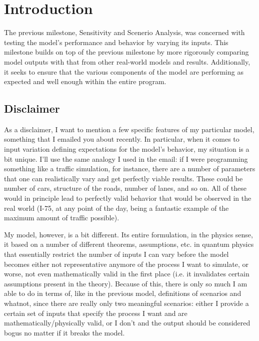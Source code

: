 \section{Introduction}

The previous milestone, Sensitivity and Scenerio Analysis, was concerned with testing the model's performance and behavior by varying its inputs. This milestone builds on top of the previous milestone by more rigorously comparing model outputs with that from other real-world models and results. Additionally, it seeks to ensure that the various components of the model are performing as expected and well enough within the entire program.


\subsection{Disclaimer}\label{sec:disclaimer}

As a disclaimer, I want to mention a few specific features of my particular model, something that I emailed you about recently. In particular, when it comes to input variation defining expectations for the model's behavior, my situation is a bit unique. I'll use the same analogy I used in the email: if I were programming something like a traffic simulation, for instance, there are a number of parameters that one can realistically vary and get perfectly viable results. These could be number of cars, structure of the roads, number of lanes, and so on. All of these would in principle lead to perfectly valid behavior that would be observed in the real world (I-75, at any point of the day, being a fantastic example of the maximum amount of traffic possible).

My model, however, is a bit different. Its entire formulation, in the physics sense, it based on a number of different theorems, assumptions, etc. in quantum physics that essentially restrict the number of inputs I can vary before the model becomes either not representative anymore of the process I want to simulate, or worse, not even mathematically valid in the first place (i.e. it invalidates certain assumptions present in the theory). Because of this, there is only so much I am able to do in terms of, like in the previous model, definitions of scenarios and whatnot, since there are really only two meaningful scenarios: either I provide a certain set of inputs that specify the process I want and are mathematically/physically valid, or I don't and the output should be considered bogus no matter if it breaks the model.

